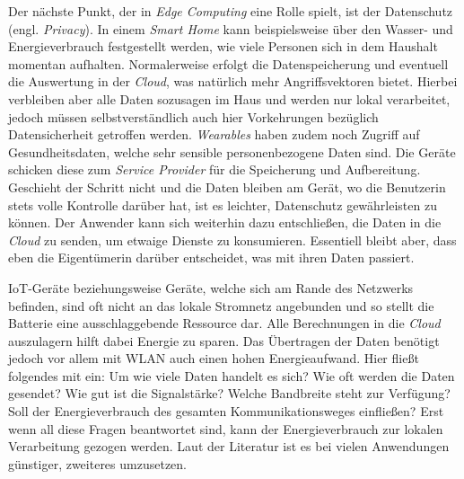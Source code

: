Der nächste Punkt, der in \textit{Edge Computing} eine Rolle spielt, ist der Datenschutz (engl. \textit{Privacy}). In einem \textit{Smart Home} kann beispielsweise über den Wasser- und Energieverbrauch festgestellt werden, wie viele Personen sich in dem Haushalt momentan aufhalten. Normalerweise erfolgt die Datenspeicherung und eventuell die Auswertung in der \textit{Cloud}, was natürlich mehr Angriffsvektoren bietet. Hierbei verbleiben aber alle Daten sozusagen im Haus und werden nur lokal verarbeitet, jedoch müssen selbstverständlich auch hier Vorkehrungen bezüglich Datensicherheit getroffen werden. \textit{Wearables} haben zudem noch Zugriff auf Gesundheitsdaten, welche sehr sensible personenbezogene Daten sind. Die Geräte schicken diese zum \textit{Service Provider} für die Speicherung und Aufbereitung. Geschieht der Schritt nicht und die Daten bleiben am Gerät, wo die Benutzerin stets volle Kontrolle darüber hat, ist es leichter, Datenschutz gewährleisten zu können. Der Anwender kann sich weiterhin dazu entschließen, die Daten in die \textit{Cloud} zu senden, um etwaige Dienste zu konsumieren. Essentiell bleibt aber, dass eben die Eigentümerin darüber entscheidet, was mit ihren Daten passiert.

IoT-Geräte beziehungsweise Geräte, welche sich am Rande des Netzwerks befinden, sind oft nicht an das lokale Stromnetz angebunden und so stellt die Batterie eine ausschlaggebende Ressource dar. Alle Berechnungen in die \textit{Cloud} auszulagern hilft dabei Energie zu sparen. Das Übertragen der Daten benötigt jedoch vor allem mit WLAN auch einen hohen Energieaufwand. Hier fließt folgendes mit ein: Um wie viele Daten handelt es sich? Wie oft werden die Daten gesendet? Wie gut ist die Signalstärke? Welche Bandbreite steht zur Verfügung? Soll der Energieverbrauch des gesamten Kommunikationsweges einfließen? Erst wenn all diese Fragen beantwortet sind, kann der Energieverbrauch zur lokalen Verarbeitung gezogen werden. Laut der Literatur \cite{Shi2016} ist es bei vielen Anwendungen günstiger, zweiteres umzusetzen.